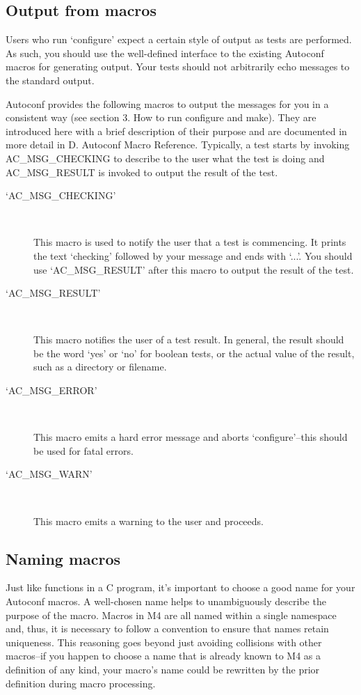 \subsection{Output from macros}

Users who run `configure' expect a certain style of output as tests are performed. As such, you should use the well-defined interface to the existing Autoconf macros for generating output. Your tests should not arbitrarily echo messages to the standard output.

Autoconf provides the following macros to output the messages for you in a consistent way (see section 3. How to run configure and make). They are introduced here with a brief description of their purpose and are documented in more detail in D. Autoconf Macro Reference. Typically, a test starts by invoking AC\_{}MSG\_{}CHECKING to describe to the user what the test is doing and AC\_{}MSG\_{}RESULT is invoked to output the result of the test.

\begin{description}
\item[`AC\_{}MSG\_{}CHECKING']
\

    This macro is used to notify the user that a test is commencing. It prints the text `checking' followed by your message and ends with `...'. You should use `AC\_{}MSG\_{}RESULT' after this macro to output the result of the test. 
\item[`AC\_{}MSG\_{}RESULT']
\

    This macro notifies the user of a test result. In general, the result should be the word `yes' or `no' for boolean tests, or the actual value of the result, such as a directory or filename. 
\item[`AC\_{}MSG\_{}ERROR']
\

    This macro emits a hard error message and aborts `configure'--this should be used for fatal errors. 
\item[`AC\_{}MSG\_{}WARN']
\

    This macro emits a warning to the user and proceeds. 
\end{description}

\subsection{Naming macros}

Just like functions in a C program, it's important to choose a good name for your Autoconf macros. A well-chosen name helps to unambiguously describe the purpose of the macro. Macros in M4 are all named within a single namespace and, thus, it is necessary to follow a convention to ensure that names retain uniqueness. This reasoning goes beyond just avoiding collisions with other macros--if you happen to choose a name that is already known to M4 as a definition of any kind, your macro's name could be rewritten by the prior definition during macro processing.

